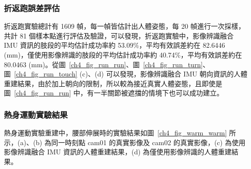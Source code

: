 \subsubsection*{折返跑誤差評估}
折返跑實驗總計有 1609 幀，每一幀皆估計出人體姿態，每 20 幀進行一次採樣，共計 81 個樣本點進行評估及驗證，可以發現，折返跑實驗中，影像辨識融合 IMU 資訊的肢段的平均估計成功率約 53.09\%，平均有效誤差約在 82.6446 (mm)，僅使用影像辨識的肢段的平均估計成功率約 40.74\%，平均有效誤差約在 80.0463 (mm)。從圖~\ref{ch4_fig_run_run}、圖~\ref{ch4_fig_run_turn}、圖~\ref{ch4_fig_run_touch} (c)、(d) 可以發現，影像辨識融合 IMU 朝向資訊的人體重建結果，由於加上朝向的限制，所以較為接近真實人體姿態，且即使是圖~\ref{ch4_fig_run_run} 中，有一半關節被遮擋的情境下也可以成功建立。

\clearpage

\subsubsection*{熱身運動實驗結果}
熱身運動實驗重建中，腰部伸展時的實驗結果如圖~\ref{ch4_fig_warm_warm} 所示，(a)、(b) 為同一時刻點 cam01 的真實影像及 cam02 的真實影像，(c) 為使用影像辨識融合 IMU 資訊的人體重建結果，(d) 為僅使用影像辨識的人體重建結果。

